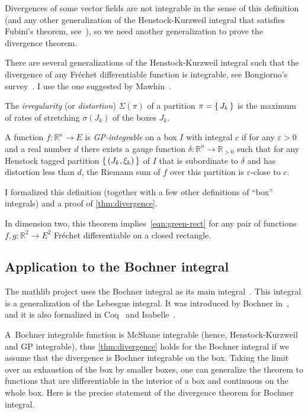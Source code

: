 \documentclass[a4paper,UKenglish,cleveref, autoref, thm-restate]{lipics-v2021}
\newcommand{\bbR}{\mathbb{R}}
\newcommand{\eps}{\varepsilon}
\begin{document}
Divergences of some vector fields are not integrable in the sense of
this definition (and any other generalization of the Henstock-Kurzweil
integral that satisfies Fubini's theorem, see~\cite{Pfeffer93}), so we
need another generalization to prove the divergence theorem.

There are several generalizations of the Henstock-Kurzweil integral
such that the divergence of any Fréchet differentiable function is
integrable, see Bongiorno's survey~\cite{BONGIORNO2002587}.  I use the
one suggested by Mawhin~\cite{Mawhin81}.

\begin{definition}%
  \label{def:GP-integral}
  The \emph{irregularity} (or \emph{distortion}) \(\Sigma(\pi)\) of a
  partition \(\pi=\set{J_{k}}\) is the maximum of rates of stretching
  \(\sigma(J_{k})\) of the boxes \(J_{k}\).

  A function \(f\colon \bbR^{n}\to E\) is \emph{GP-integrable} on a
  box \(I\) with integral \(c\) if for any \(\eps>0\) and a real
  number \(d\) there exists a gauge function
  \(\delta\colon \bbR^{n}\to \bbR_{>0}\) such that for any Henstock
  tagged partition \(\set{(J_{k}, \xi_{k})}\) of \(I\) that is
  subordinate to \(\delta\) and has distortion less than \(d\), the
  Riemann sum of \(f\) over this partition is \(\eps\)-close to \(c\).
\end{definition}

I formalized this definition (together with a few other definitions of
“box” integrals) and a proof of \autoref{thm:divergence}.

In dimension two, this theorem implies~\eqref{eqn:green-rect} for any
pair of functions \(f, g \colon \bbR^{2}\to E^{2}\) Fréchet
differentiable on a closed rectangle.

\subsection{Application to the Bochner integral}

The mathlib project uses the Bochner integral as its main
integral~\cite{vandoorn:LIPIcs.ITP.2021.18}. This integral is a
generalization of the Lebesgue integral. It was introduced by Bochner
in~\cite{Bochner1933IntegrationVF}, and it is also formalized in
Coq~\cite{boldo2022coq} and Isabelle~\cite{Avigad17}.

A~Bochner integrable function is McShane integrable (hence,
Henstock-Kurzweil and GP integrable), thus \autoref{thm:divergence}
holds for the Bochner integral if we assume that the divergence is
Bochner integrable on the box. Taking the limit over an exhaustion of
the box by smaller boxes, one can generalize the theorem to functions
that are differentiable in the interior of a box and continuous on the
whole box. Here is the precise statement of the divergence theorem for
Bochner integral.
\end{document}
